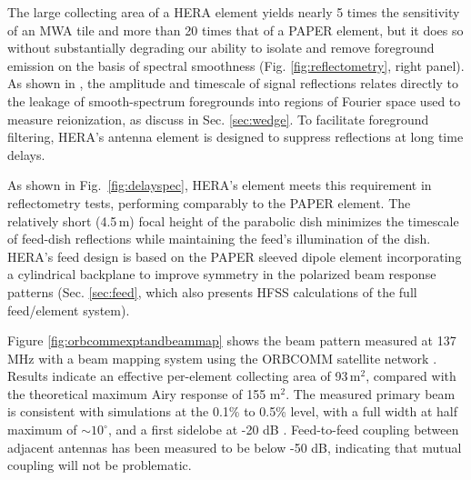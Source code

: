 \documentclass[preprint,11pt]{aastex}
\newcommand{\Mycitet}[1]{\citet{#1}}
\newcommand{\Mycitep}[1]{\citep{#1}}
\begin{document}
The large collecting area of a HERA element yields nearly 5 times the sensitivity of an MWA tile and more
than 20 times that of a PAPER element, but it does so without substantially
degrading our ability to isolate and remove foreground emission on the basis of
spectral smoothness (Fig. \ref{fig:reflectometry}, right panel).  As shown in
\Mycitet{parsons_et_al2012b}, the amplitude and timescale of signal reflections
relates directly to the leakage of smooth-spectrum foregrounds into regions of Fourier space 
used to measure reionization, as discuss in Sec. \ref{sec:wedge}.
To facilitate foreground filtering, HERA's antenna element is designed to suppress reflections at long time delays.


As shown in Fig.~\ref{fig:delayspec}, HERA's element meets this requirement in
reflectometry tests, performing comparably to the PAPER element.  The
relatively short (4.5\,m) focal height of the parabolic dish 
minimizes the timescale of feed-dish reflections while maintaining the feed's
illumination of the dish.  HERA's feed design is based on the PAPER sleeved
dipole element incorporating a cylindrical backplane to
improve symmetry in the polarized beam response patterns (Sec. \ref{sec:feed}, which also presents HFSS calculations of the full feed/element system).


Figure \ref{fig:orbcommexptandbeammap} shows the beam pattern measured at 137 MHz with a beam mapping
system using the ORBCOMM satellite network \Mycitep{neben_et_al2016}.  Results
indicate an effective per-element collecting area of 93\,m$^2$, compared with the
theoretical maximum Airy response of 155 m$^2$.  The measured primary beam is
consistent with simulations at the 0.1\% to 0.5\% level, with a full width at
half maximum of $\sim$$10^\circ$, and a first sidelobe at -20 dB \citep{ewallwice_et_al2016,neben_et_al2016,patra_et_al2016,thyagarajan_et_al2016}.
Feed-to-feed coupling between adjacent antennas has been measured to be below -50 dB, indicating
that mutual coupling will not be problematic.
\end{document}
